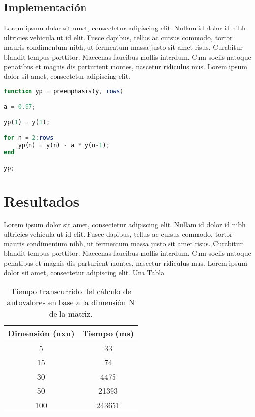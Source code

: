 \documentclass[a4paper,10pt]{article}
\begin{document}
\subsection{Implementación}
Lorem ipsum dolor sit amet, consectetur adipiscing elit. Nullam id dolor id nibh ultricies vehicula ut id elit. Fusce dapibus, tellus ac cursus commodo, tortor mauris condimentum nibh, ut fermentum massa justo sit amet risus. Curabitur blandit tempus porttitor. Maecenas faucibus mollis interdum. Cum sociis natoque penatibus et magnis dis parturient montes, nascetur ridiculus mus. Lorem ipsum dolor sit amet, consectetur adipiscing elit.
\newline
\begin{lstlisting}[language=Octave, caption = Pre-énfasis]
function yp = preemphasis(y, rows)

a = 0.97;

yp(1) = y(1);

for n = 2:rows
	yp(n) = y(n) - a * y(n-1);
end

yp;
\end{lstlisting}

\section{Resultados}
Lorem ipsum dolor sit amet, consectetur adipiscing elit. Nullam id dolor id nibh ultricies vehicula ut id elit. Fusce dapibus, tellus ac cursus commodo, tortor mauris condimentum nibh, ut fermentum massa justo sit amet risus. Curabitur blandit tempus porttitor. Maecenas faucibus mollis interdum. Cum sociis natoque penatibus et magnis dis parturient montes, nascetur ridiculus mus. Lorem ipsum dolor sit amet, consectetur adipiscing elit.
\newline
Una Tabla

\begin{center}
\begin{table}[h]
\centering
\begin{tabular}{cc}
\hline
\textbf{Dimensión (nxn)} & \textbf{Tiempo (ms)} \\ \hline
5                  & 33                 \\
15                 & 74                 \\
30                 & 4475                 \\
50                 & 21393                \\
100                & 243651                   
\end{tabular}
\caption[Texto del índice (opcional)]{Tiempo transcurrido del cálculo de autovalores en base a la dimensión N de la matriz.}
\end{table}
\end{center}
\end{document}
